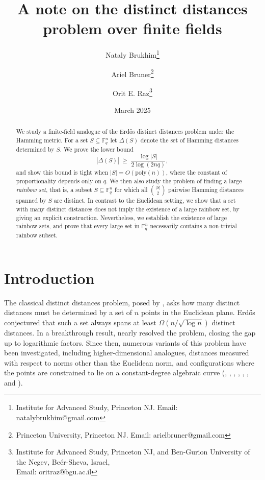 \documentclass{article}
\title{A note on the distinct distances problem over finite fields}
\author{
Nataly Brukhim\thanks{Institute for Advanced Study, Princeton NJ. Email: natalybrukhim@gmail.com} \and
Ariel Bruner\thanks{Princeton University, Princeton NJ.
		Email: arielbruner@gmail.com} \and
Orit E. Raz\thanks{Institute for Advanced Study, Princeton NJ, and Ben-Gurion University of the Negev, Be\'er-Sheva, Israel,\\ \indent Email:  oritraz@bgu.ac.il}}
\date{March 2025}
\theoremstyle{definition}
\begin{document}
\maketitle
\begin{abstract}
    We study a finite-field analogue of the Erd\H{o}s distinct distances problem under the Hamming metric. For a set \(S\subseteq \mathbb{F}_q^n\)   let $\Delta(S)$
denote the set of Hamming distances determined by \(S\). We prove the lower bound
\[
|\Delta(S)| \;\ge\; \frac{\log |S|}{2\log(2nq)},
\]
and show this bound is tight when \(|S|=O(\text{poly}(n))\), where the constant of proportionality depends only on $q$. We then also study the problem of finding a large \emph{rainbow set}, that is, a subset \(S\subseteq \mathbb{F}_q^n\) for which all \(\binom{|S|}{2}\) pairwise Hamming distances spanned by $S$ are distinct. 
In contrast to the Euclidean setting,  we show that a set with many distinct distances does not imply the existence of a large rainbow set,  by giving an explicit construction.
 Nevertheless, we establish the existence of large rainbow sets, and prove that every large set in \(\mathbb{F}_q^n\) necessarily contains a non-trivial rainbow subset.

\end{abstract}

\vspace{1ex}





\section{Introduction}
The classical distinct distances problem, posed by \cite{erdos1946}, asks how many distinct distances must be determined by a set of $n$ points in the Euclidean plane. Erd\H{o}s conjectured that such a set always spans at least $\Omega(n/\sqrt{\log n})$ distinct distances. In a breakthrough result, \cite{GuthKatz} nearly resolved the problem, closing the gap up to logarithmic factors. Since then, numerous variants of this problem have been investigated, including higher-dimensional analogues, distances measured with respect to norms other than the Euclidean norm, and configurations where the points are constrained to lie on a constant-degree algebraic curve (\cite{Alon25}, \cite{GuthKatz}, \cite{pach2014distinct}, \cite{charalambides2014distinct}, \cite{mathialagan2023distinct},  \cite{raz2020note}, \cite{aronov2003distinct} and \cite{sheffer2014distinct}).
 
\end{document}
